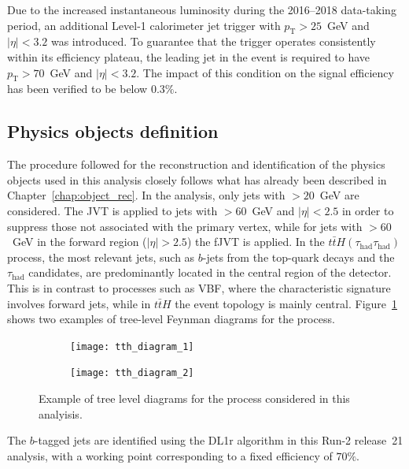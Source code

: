 Due to the increased instantaneous luminosity during the 2016--2018 data-taking period, an additional Level-1 calorimeter jet trigger with $p_{\text{T}} > 25$~GeV and $|\eta| < 3.2$ was introduced. To guarantee that the trigger operates consistently within its efficiency plateau, the leading jet in the event is required to have $p_{\text{T}} > 70$~GeV and $|\eta| < 3.2$. The impact of this condition on the signal efficiency has been verified to be below $0.3\%$.

\subsection{Physics objects definition}
\label{subsec:trigger_tth}

The procedure followed for the reconstruction and identification of the physics objects used in this analysis closely follows what has already been described in Chapter~\ref{chap:object_rec}.  
In the \ttHtt analysis, only jets with \pt$>20$~GeV are considered. The JVT is applied to jets with \pt$ > 60$~GeV and $|\eta| < 2.5$ in order to suppress those not associated with the primary vertex, while for jets with \pt$ > 60$~GeV in the forward region ($|\eta| > 2.5$) the fJVT is applied. In the $t\bar{t}H(\tau_{\text{had}}\tau_{\text{had}})$ process, the most relevant jets, such as $b$-jets from the top-quark decays and the $\tau_{\text{had}}$ candidates, are predominantly located in the central region of the detector. This is in contrast to processes such as VBF, where the characteristic signature involves forward jets, while in $t\bar{t}H$ the event topology is mainly central. Figure~\ref{fig:tth_topo} shows two examples of tree-level Feynman diagrams for the \ttHtt process.
\begin{figure}[htbp]
    \centering
    \begin{subfigure}[b]{0.48\textwidth}
        \texttt{[image: tth\_diagram\_1]}
    \end{subfigure}
    \hfill
    \begin{subfigure}[b]{0.48\textwidth}
        \texttt{[image: tth\_diagram\_2]}
    \end{subfigure}
    \hfill
    \caption{Example of tree level diagrams for the \ttHtt process considered in this analyisis.}
    \label{fig:tth_topo}
\end{figure}
\FloatBarrier
The $b$-tagged jets are identified using the DL1r algorithm in this Run-2 release~21 analysis, with a working point corresponding to a fixed efficiency of $70\%$.  

